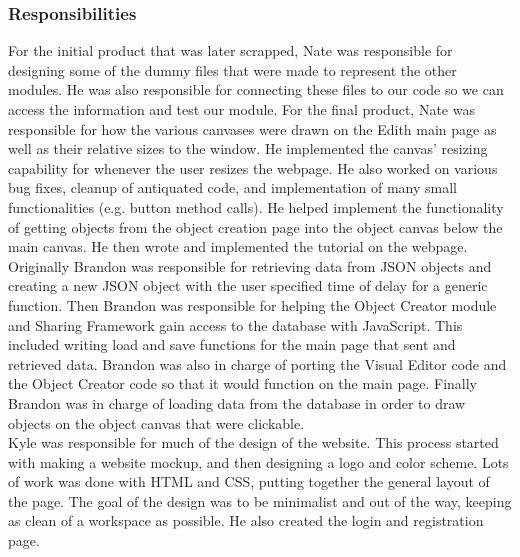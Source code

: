 \documentclass[12pt]{article}
\begin{document}
\subsubsection{Responsibilities}

For the initial product that was later scrapped, Nate was responsible for designing some of the dummy files that were made to represent the other modules. He was also responsible for connecting these files to our code so we can access the information and test our module. For the final product, Nate was responsible for how the various canvases were drawn on the Edith main page as well as their relative sizes to the window. He implemented the canvas' resizing capability for whenever the user resizes the webpage. He also worked on various bug fixes, cleanup of antiquated code, and implementation of many small functionalities (e.g. button method calls). He helped implement the functionality of getting objects from the object creation page into the object canvas below the main canvas. He then wrote and implemented the tutorial on the webpage. \\

Originally Brandon was responsible for retrieving data from JSON objects and creating a new JSON object with the user specified time of delay for a generic function.  Then Brandon was responsible for helping the Object Creator module and Sharing Framework gain access to the database with JavaScript.  This included writing load and save functions for the main page that sent and retrieved data.  Brandon was also in charge of porting the Visual Editor code and the Object Creator code so that it would function on the main page.  Finally Brandon was in charge of loading data from the database in order to draw objects on the object canvas that were clickable.  \\

Kyle was responsible for much of the design of the website. This process started with making a website mockup, and then designing a logo and color scheme. Lots of work was done with HTML and CSS, putting together the general layout of the page. The goal of the design was to be minimalist and out of the way, keeping as clean of a workspace as possible. He also created the login and registration page. \\
\end{document}
